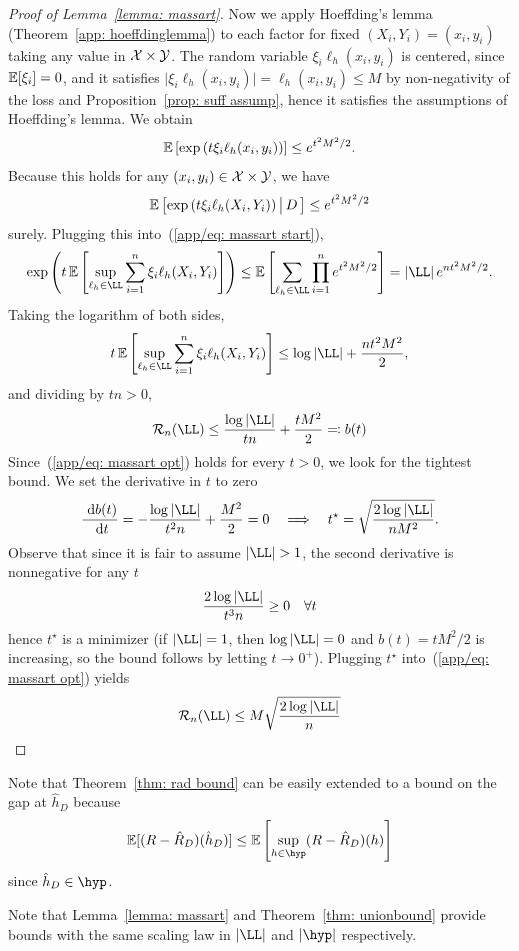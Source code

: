\documentclass[reqno]{amsart}
\begin{document}
\begin{lemma}[Massart]
\begin{proof}[Proof of Lemma~\ref{lemma: massart}]
Now we apply Hoeffding's lemma (Theorem~\ref{app: hoeffdinglemma}) to each factor for fixed $(X_i,Y_i)=(x_i,y_i)$ taking any value in $\mathcal{X}\times\mathcal{Y}$. The random variable $\xi_i\ell_h(x_i,y_i)$ is centered, since $\mathbb{E}[\xi_i]=0$, and it satisfies $\vert\xi_i\ell_h(x_i,y_i)\vert = \ell_h(x_i,y_i)\le M$ by non-negativity of the loss and Proposition~\ref{prop: suff assump}, hence it satisfies the assumptions of Hoeffding's lemma. We obtain
\[
\mathbb{E}\left[\exp\left(t\xi_i\ell_h(x_i,y_i)\right)\right] \le e^{t^2M^2/2}.
\]
Because this holds for any $(x_i,y_i)\in\mathcal{X}\times\mathcal{Y}$, we have
\[
\mathbb{E}\left[\exp\left(t\xi_i\ell_h(X_i,Y_i)\right)\big\vert\,D\,\right] \le e^{t^2M^2/2}
\]
surely.
Plugging this into~(\ref{app/eq: massart start}),
\[
\exp\left(t\,\expv\left[\sup_{\ell_h\in\LL}\sum_{i=1}^n \xi_i\ell_h(X_i,Y_i)\right]\right) \le \expv\left[\sum_{\ell_h\in\LL}\prod_{i=1}^n e^{t^2M^2/2}\right] = \vert\LL\vert\, e^{nt^2M^2/2}.
\]
Taking the logarithm of both sides,
\[
t\,\expv\left[\sup_{\ell_h\in\LL}\sum_{i=1}^n \xi_i\ell_h(X_i,Y_i)\right] \le \log\vert\LL\vert + \frac{nt^2M^2}{2},
\]
and dividing by $tn>0$,
\begin{equation}\label{app/eq: massart opt}
\mathcal R_n(\LL) \le \frac{\log\vert\LL\vert}{tn} + \frac{tM^2}{2} \eqqcolon b(t)
\end{equation}
Since~(\ref{app/eq: massart opt}) holds for every $t>0$, we look for the tightest bound. We set the derivative in $t$ to zero
\[
\deriv{b(t)}{t}= 
-\frac{\log\vert\LL\vert}{t^2n} + \frac{M^2}{2} = 0 \quad\Longrightarrow\quad t^\star = \sqrt{\frac{2\log\vert\LL\vert}{nM^2}}.
\]
Observe that since it is fair to assume $\vert\LL\vert>1$, the second derivative is nonnegative for any $t$
\[\frac{2\log\vert\LL\vert}{t^3n}\ge0 \quad \forall t\] hence $t^\star$ is a minimizer (if $\vert\LL\vert = 1$, then $\log\vert\LL\vert=0$ and $b(t)=tM^2/2$ is increasing, so the bound follows by letting $t\to0^+$). Plugging $t^\star$ into~(\ref{app/eq: massart opt}) yields
\[
\mathcal R_n(\LL) \le M\sqrt{\frac{2\log\vert\LL\vert}{n}}
\]
\end{proof}
\end{lemma}

Note that Theorem~\ref{thm: rad bound} can be easily extended to a bound on the gap at $\hat h_D$ because
\[
\expv[(R - \hat R_D)(\hat h_D)] \le \expv\left[\sup_{h \in \hyp}(R - \hat R_D)(h)\right]
\]
since $\hat h_D\in\hyp$. 

Note that Lemma~\ref{lemma: massart} and Theorem~\ref{thm: unionbound} provide bounds with the same scaling law in $\vert \LL\vert$ and $\vert \hyp\vert$ respectively.
\end{document}
